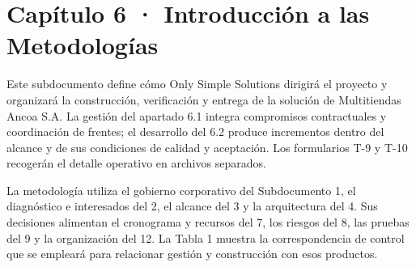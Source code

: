\documentclass[11pt]{article}
\begin{document}
\renewcommand{\contentsname}{Índice general}
\renewcommand{\listfigurename}{Lista de figuras}
\renewcommand{\listtablename}{Lista de tablas}
\renewcommand{\tablename}{Tabla}
\renewcommand{\figurename}{Figura}
\setcounter{tocdepth}{4}
\makeatletter
\renewcommand\paragraph{\@startsection{paragraph}{4}{\z@}{2.2ex \@plus 1ex \@minus .2ex}{0.6ex}{\normalfont\normalsize\bfseries}}
\renewcommand\subparagraph{\@startsection{subparagraph}{5}{\z@}{1.8ex \@plus .6ex \@minus .2ex}{0.4ex}{\normalfont\normalsize\bfseries\itshape}}
\renewcommand*\l@figure{\@dottedtocline{1}{1.5em}{2.9em}}
\renewcommand*\l@table{\@dottedtocline{1}{1.5em}{2.9em}}
\makeatother
\tableofcontents
\clearpage
\listoffigures
\clearpage
\listoftables
\clearpage

\section{Capítulo 6 · Introducción a las Metodologías}\label{capitulo-6-introduccion-a-las-metodologias}

Este subdocumento define cómo Only Simple Solutions dirigirá el proyecto
y organizará la construcción, verificación y entrega de la solución de
Multitiendas Ancoa S.A. La gestión del apartado 6.1 integra compromisos
contractuales y coordinación de frentes; el desarrollo del 6.2 produce
incrementos dentro del alcance y de sus condiciones de calidad y
aceptación. Los formularios T-9 y T-10 recogerán el detalle operativo en
archivos separados.

La metodología utiliza el gobierno corporativo del Subdocumento 1, el
diagnóstico e interesados del 2, el alcance del 3 y la arquitectura del
4. Sus decisiones alimentan el cronograma y recursos del 7, los riesgos
del 8, las pruebas del 9 y la organización del 12. La Tabla 1 muestra
la correspondencia de control que se empleará para relacionar gestión y
construcción con esos productos.
\end{document}
